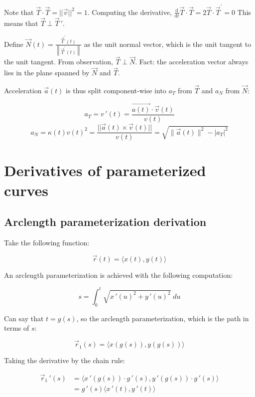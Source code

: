 Note that $\vec{T}\cdot \vec{T}=||\vec{v}||^2=1$.
Computing the derivative, $\frac{\mathrm{d}}{\mathrm{d} t} \vec{T} \cdot \vec{T}=2 \vec{T} \cdot \vec{T}^{\prime}=0$
This means that $\vec{T}\perp \vec{T}\,'$.\newline

\noindent
Define $\boxed{\vec{N}(t)=\frac{\vec{T}^{\prime}(t)}{\left\|\vec{T}^{\prime}(t)\right\|}}$ as
the unit normal vector, which is the unit tangent to the unit tangent. From observation, $\vec{T}\perp \vec{N}$.
Fact: the acceleration vector always lies in the plane spanned by $\vec{N}$ and $\vec{T}$.\newline

\noindent
Acceleration $\vec{a}(t)$ is thus split component-wise into $a_T$ from $\vec{T}$
and $a_N$ from $\vec{N}$:

\[\boxed{a_T=v\,'(t)=\frac{\vec{a(t)}\cdot \vec{v}(t)}{v(t)}}\]
\[\boxed{a_N=\kappa(t)v(t)^2=\frac{||\vec{a}(t)\times \vec{v}(t)||}{v(t)}=\sqrt{\|\vec{a}(t)\|^{2}-\left|a_{T}\right|^{2}}}\]

\section{Derivatives of parameterized curves}

\subsection{Arclength parameterization derivation}

Take the following function:

\[\vec{r}(t)=\langle x(t),y(t) \rangle\]

An arclength parameterization is achieved with the following computation:

\[s=\int_0^t \sqrt{x\,'(u)^2+y\,'(u)^2}\;du\]

Can say that $t=g(s)$, so the arclength parameterization, which is the path in terms of $s$:

\[\vec{r}_1(s)=\langle x(g(s)),y(g(s))\rangle\]

Taking the derivative by the chain rule:

\begin{align*}
    \vec{r}_1\,'(s)&=\langle x\,'(g(s))\cdot g\,'(s),y\,'(g(s))\cdot g\,'(s)\rangle \\
    &=g\,'(s)\langle x\,'(t),y\,'(t) \rangle \\
\end{align*}

